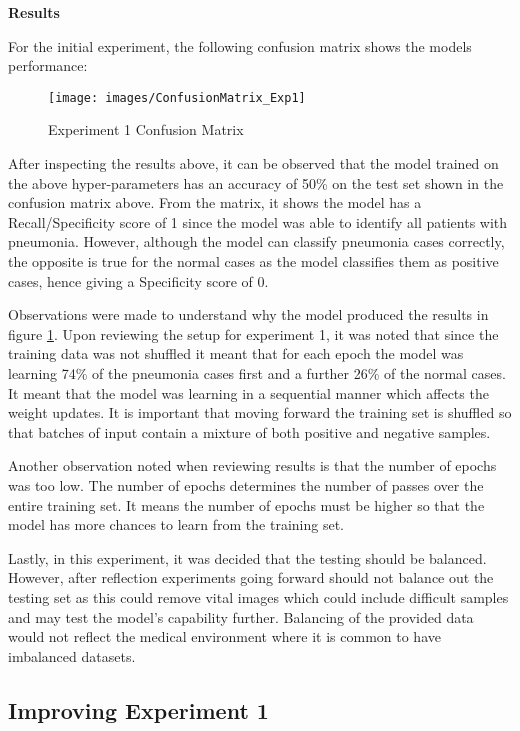 \textbf{Results}

For the initial experiment, the following confusion matrix shows the models performance: 

 \begin{figure}[H]
	\centering
	\hspace{-3cm}
	\texttt{[image: images/ConfusionMatrix\_Exp1]}
	\caption{Experiment 1 Confusion Matrix}
	\label{fig:exp1_conf}

\end{figure}
\newpage

After inspecting the results above, it can be observed that the model trained on the above hyper-parameters has an accuracy of 50\%  on the test set shown in the confusion matrix above. From the matrix, it shows the model has a Recall/Specificity score of 1 since the model was able to identify all patients with pneumonia. However, although the model can classify pneumonia cases correctly, the opposite is true for the normal cases as the model classifies them as positive cases, hence giving a Specificity score of 0.


Observations were made to understand why the model produced the results in figure \ref{fig:exp1_conf}. Upon reviewing the setup for experiment 1, it was noted that since the training data was not shuffled it meant that for each epoch the model was learning 74\% of the pneumonia cases first and a further 26\% of the normal cases. It meant that the model was learning in a sequential manner which affects the weight updates. It is important that moving forward the training set is shuffled so that batches of input contain a mixture of both positive and negative samples. 

Another observation noted when reviewing results is that the number of epochs was too low. The number of epochs determines the number of passes over the entire training set. It means the number of epochs must be higher so that the model has more chances to learn from the training set.


Lastly, in this experiment, it was decided that the testing should be balanced. However, after reflection experiments going forward should not balance out the testing set as this could remove vital images which could include difficult samples and may test the model's capability further. Balancing of the provided data would not reflect the medical environment where it is common to have imbalanced datasets. 
 
 
\newpage
\subsection{Improving Experiment 1} \label{Improving Experiment1}

